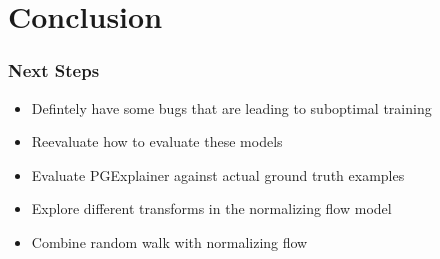 \documentclass[11pt]{beamer}
\begin{document}
\section{Conclusion}
\begin{frame}
    \frametitle{Next Steps}

    \begin{itemize}
        \item Defintely have some bugs that are leading to suboptimal training
        \item Reevaluate how to evaluate these models
        \item Evaluate PGExplainer against actual ground truth examples
        \item Explore different transforms in the normalizing flow model
        \item Combine random walk with normalizing flow
    \end{itemize}
\end{frame}
\end{document}
